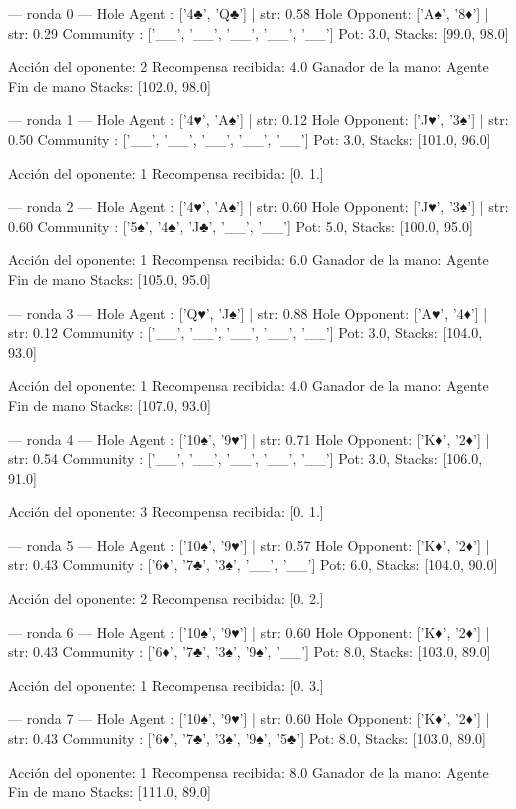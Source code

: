 
--- ronda 0 ---
Hole Agent : ['4♣', 'Q♣'] | str: 0.58
Hole Opponent: ['A♠', '8♦'] | str: 0.29
Community  : ['__', '__', '__', '__', '__']
Pot: 3.0, Stacks: [99.0, 98.0]

Acción del oponente: 2
Recompensa recibida: 4.0
Ganador de la mano: Agente
Fin de mano Stacks: [102.0, 98.0]


--- ronda 1 ---
Hole Agent : ['4♥', 'A♠'] | str: 0.12
Hole Opponent: ['J♥', '3♠'] | str: 0.50
Community  : ['__', '__', '__', '__', '__']
Pot: 3.0, Stacks: [101.0, 96.0]

Acción del oponente: 1
Recompensa recibida: [0. 1.]

--- ronda 2 ---
Hole Agent : ['4♥', 'A♠'] | str: 0.60
Hole Opponent: ['J♥', '3♠'] | str: 0.60
Community  : ['5♠', '4♠', 'J♣', '__', '__']
Pot: 5.0, Stacks: [100.0, 95.0]

Acción del oponente: 1
Recompensa recibida: 6.0
Ganador de la mano: Agente
Fin de mano Stacks: [105.0, 95.0]


--- ronda 3 ---
Hole Agent : ['Q♥', 'J♠'] | str: 0.88
Hole Opponent: ['A♥', '4♦'] | str: 0.12
Community  : ['__', '__', '__', '__', '__']
Pot: 3.0, Stacks: [104.0, 93.0]

Acción del oponente: 1
Recompensa recibida: 4.0
Ganador de la mano: Agente
Fin de mano Stacks: [107.0, 93.0]


--- ronda 4 ---
Hole Agent : ['10♠', '9♥'] | str: 0.71
Hole Opponent: ['K♦', '2♦'] | str: 0.54
Community  : ['__', '__', '__', '__', '__']
Pot: 3.0, Stacks: [106.0, 91.0]

Acción del oponente: 3
Recompensa recibida: [0. 1.]

--- ronda 5 ---
Hole Agent : ['10♠', '9♥'] | str: 0.57
Hole Opponent: ['K♦', '2♦'] | str: 0.43
Community  : ['6♦', '7♣', '3♠', '__', '__']
Pot: 6.0, Stacks: [104.0, 90.0]

Acción del oponente: 2
Recompensa recibida: [0. 2.]

--- ronda 6 ---
Hole Agent : ['10♠', '9♥'] | str: 0.60
Hole Opponent: ['K♦', '2♦'] | str: 0.43
Community  : ['6♦', '7♣', '3♠', '9♠', '__']
Pot: 8.0, Stacks: [103.0, 89.0]

Acción del oponente: 1
Recompensa recibida: [0. 3.]

--- ronda 7 ---
Hole Agent : ['10♠', '9♥'] | str: 0.60
Hole Opponent: ['K♦', '2♦'] | str: 0.43
Community  : ['6♦', '7♣', '3♠', '9♠', '5♣']
Pot: 8.0, Stacks: [103.0, 89.0]

Acción del oponente: 1
Recompensa recibida: 8.0
Ganador de la mano: Agente
Fin de mano Stacks: [111.0, 89.0]


